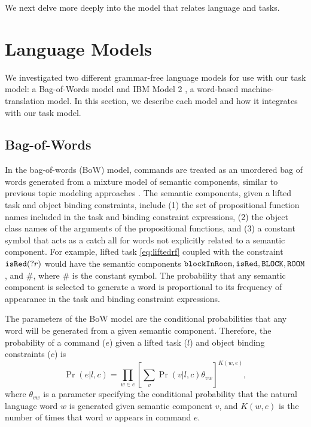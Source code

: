 \documentclass[conference]{IEEEtran}
\begin{document}
We next delve more deeply into the model that relates language and tasks.

\section{Language Models} 
\label{section:lm}

We investigated two different grammar-free language models for use with our task model: a Bag-of-Words model and IBM Model 2 \cite{brown90,brown93}, a word-based machine-translation model. In this section, we describe each model and how it integrates with our task model.

\subsection{Bag-of-Words}
In the bag-of-words (BoW) model, commands are treated as an unordered bag of words generated from a mixture model of semantic components, similar to previous topic modeling approaches \cite{McCallum:1999vn}. The semantic components, given a lifted task and object binding constraints, include (1) the set of propositional function names included in the task and binding constraint expressions, (2) the object class names of the arguments of the propositional functions, and (3) a constant symbol that acts as a catch all for words not explicitly related to a semantic component. For example, lifted task \ref{eq:liftedrf} coupled with the constraint ${\tt isRed}(?r)$ would have the semantic components ${\tt blockInRoom}, {\tt isRed}, {\tt BLOCK}, {\tt ROOM}$, and $\#$, where $\#$ is the constant symbol. The probability that any semantic component is selected to generate a word is proportional to its frequency of appearance in the task and binding constraint expressions.

The parameters of the BoW model are the conditional probabilities that any word will be generated from a given semantic component. Therefore, the probability of a command ($e$) given a lifted task ($l$) and object binding constraints ($c$) is
\begin{equation}
\Pr(e | l, c)  = \prod_{w \in e} \left[ \sum_v \Pr(v | l, c) \theta_{vw} \right]^{K(w, e)},
\end{equation}
where $\theta_{vw}$ is a parameter specifying the conditional probability that the natural language word $w$ is generated given semantic component $v$, and $K(w, e)$ is the number of times that word $w$ appears in command $e$.
\end{document}
